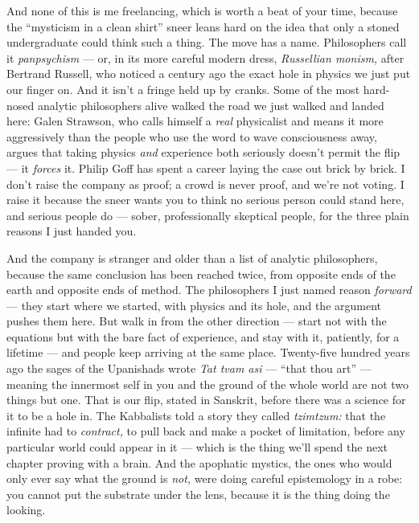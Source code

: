 \documentclass[11pt,openany]{book}
\begin{document}
And none of this is me freelancing, which is worth a beat of your time, because the “mysticism in a clean shirt” sneer leans hard on the idea that only a stoned undergraduate could think such a thing. The move has a name. Philosophers call it \textit{panpsychism} — or, in its more careful modern dress, \textit{Russellian monism,} after Bertrand Russell, who noticed a century ago the exact hole in physics we just put our finger on. And it isn’t a fringe held up by cranks. Some of the most hard-nosed analytic philosophers alive walked the road we just walked and landed here: Galen Strawson, who calls himself a \textit{real} physicalist and means it more aggressively than the people who use the word to wave consciousness away, argues that taking physics \textit{and} experience both seriously doesn’t permit the flip — it \textit{forces} it. Philip Goff has spent a career laying the case out brick by brick. I don’t raise the company as proof; a crowd is never proof, and we’re not voting. I raise it because the sneer wants you to think no serious person could stand here, and serious people do — sober, professionally skeptical people, for the three plain reasons I just handed you.

And the company is stranger and older than a list of analytic philosophers, because the same conclusion has been reached twice, from opposite ends of the earth and opposite ends of method. The philosophers I just named reason \textit{forward} — they start where we started, with physics and its hole, and the argument pushes them here. But walk in from the other direction — start not with the equations but with the bare fact of experience, and stay with it, patiently, for a lifetime — and people keep arriving at the same place. Twenty-five hundred years ago the sages of the Upanishads wrote \textit{Tat tvam asi} — “that thou art” — meaning the innermost self in you and the ground of the whole world are not two things but one. That is our flip, stated in Sanskrit, before there was a science for it to be a hole in. The Kabbalists told a story they called \textit{tzimtzum:} that the infinite had to \textit{contract,} to pull back and make a pocket of limitation, before any particular world could appear in it — which is the thing we’ll spend the next chapter proving with a brain. And the apophatic mystics, the ones who would only ever say what the ground is \textit{not,} were doing careful epistemology in a robe: you cannot put the substrate under the lens, because it is the thing doing the looking.
\end{document}
